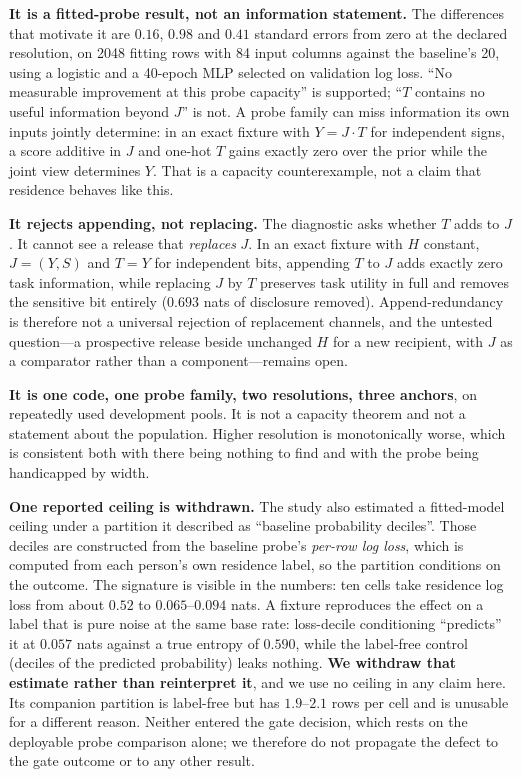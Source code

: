 \documentclass[conference]{IEEEtran}
\begin{document}
\textbf{It is a fitted-probe result, not an information statement.} The differences that motivate it are
$0.16$, $0.98$ and $0.41$ standard errors from zero at the declared resolution, on 2048 fitting rows with
84 input columns against the baseline's 20, using a logistic and a 40-epoch MLP selected on validation
log loss. ``No measurable improvement at this probe capacity'' is supported; ``$T$ contains no useful
information beyond $J$'' is not. A probe family can miss information its own inputs jointly determine: in
an exact fixture with $Y=J\cdot T$ for independent signs, a score additive in $J$ and one-hot $T$ gains
exactly zero over the prior while the joint view determines $Y$. That is a capacity counterexample, not a
claim that residence behaves like this.

\textbf{It rejects appending, not replacing.} The diagnostic asks whether $T$ adds to $J$. It cannot see
a release that \emph{replaces} $J$. In an exact fixture with $H$ constant, $J=(Y,S)$ and $T=Y$ for
independent bits, appending $T$ to $J$ adds exactly zero task information, while replacing $J$ by $T$
preserves task utility in full and removes the sensitive bit entirely ($0.693$ nats of disclosure
removed). Append-redundancy is therefore not a universal rejection of replacement channels, and the
untested question---a prospective release beside unchanged $H$ for a new recipient, with $J$ as a
comparator rather than a component---remains open.

\textbf{It is one code, one probe family, two resolutions, three anchors}, on repeatedly used development
pools. It is not a capacity theorem and not a statement about the population. Higher resolution is
monotonically worse, which is consistent both with there being nothing to find and with the probe being
handicapped by width.

\textbf{One reported ceiling is withdrawn.} The study also estimated a fitted-model ceiling under a
partition it described as ``baseline probability deciles''. Those deciles are constructed from the
baseline probe's \emph{per-row log loss}, which is computed from each person's own residence label, so
the partition conditions on the outcome. The signature is visible in the numbers: ten cells take residence
log loss from about $0.52$ to $0.065$--$0.094$ nats. A fixture reproduces the effect on a label that is
pure noise at the same base rate: loss-decile conditioning ``predicts'' it at $0.057$ nats against a true
entropy of $0.590$, while the label-free control (deciles of the predicted probability) leaks nothing.
\textbf{We withdraw that estimate rather than reinterpret it}, and we use no ceiling in any claim here.
Its companion partition is label-free but has $1.9$--$2.1$ rows per cell and is unusable for a different
reason. Neither entered the gate decision, which rests on the deployable probe comparison alone; we
therefore do not propagate the defect to the gate outcome or to any other result.
\end{document}
